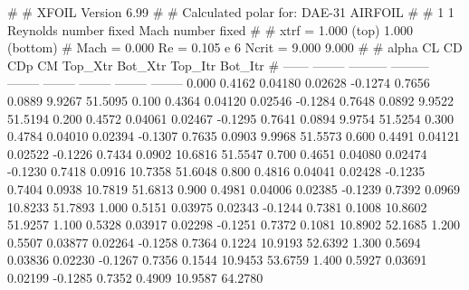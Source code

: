 #  
#       XFOIL         Version 6.99
#  
# Calculated polar for: DAE-31 AIRFOIL                                  
#  
# 1 1 Reynolds number fixed          Mach number fixed         
#  
# xtrf =   1.000 (top)        1.000 (bottom)  
# Mach =   0.000     Re =     0.105 e 6     Ncrit =   9.000  9.000
#  
#   alpha    CL        CD       CDp       CM     Top_Xtr  Bot_Xtr  Top_Itr  Bot_Itr
#  ------ -------- --------- --------- -------- -------- -------- -------- --------
   0.000   0.4162   0.04180   0.02628  -0.1274   0.7656   0.0889   9.9267  51.5095
   0.100   0.4364   0.04120   0.02546  -0.1284   0.7648   0.0892   9.9522  51.5194
   0.200   0.4572   0.04061   0.02467  -0.1295   0.7641   0.0894   9.9754  51.5254
   0.300   0.4784   0.04010   0.02394  -0.1307   0.7635   0.0903   9.9968  51.5573
   0.600   0.4491   0.04121   0.02522  -0.1226   0.7434   0.0902  10.6816  51.5547
   0.700   0.4651   0.04080   0.02474  -0.1230   0.7418   0.0916  10.7358  51.6048
   0.800   0.4816   0.04041   0.02428  -0.1235   0.7404   0.0938  10.7819  51.6813
   0.900   0.4981   0.04006   0.02385  -0.1239   0.7392   0.0969  10.8233  51.7893
   1.000   0.5151   0.03975   0.02343  -0.1244   0.7381   0.1008  10.8602  51.9257
   1.100   0.5328   0.03917   0.02298  -0.1251   0.7372   0.1081  10.8902  52.1685
   1.200   0.5507   0.03877   0.02264  -0.1258   0.7364   0.1224  10.9193  52.6392
   1.300   0.5694   0.03836   0.02230  -0.1267   0.7356   0.1544  10.9453  53.6759
   1.400   0.5927   0.03691   0.02199  -0.1285   0.7352   0.4909  10.9587  64.2780

